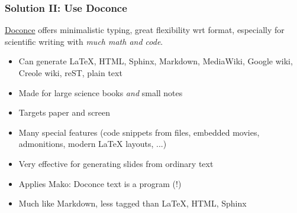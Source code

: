 \documentclass{beamer}
\newcounter{doconce:exercise:counter}
\newcounter{doconce:movie:counter}
\begin{document}
\begin{frame}
\frametitle{Solution II: Use Doconce}

\href{{http://hplgit.github.io/doconce/doc/web/index.html}}{Doconce}
offers minimalistic typing, great flexibility wrt format,
especially for scientific writing with \emph{much math and code}.

\begin{itemize}
 \item Can generate {\LaTeX}, HTML, Sphinx, Markdown, MediaWiki, Google wiki,
   Creole wiki, reST, plain text

 \item Made for large science books \emph{and} small notes

 \item Targets paper and screen

 \item Many special features (code snippets from files, embedded movies,
   admonitions, modern {\LaTeX} layouts, ...)

 \item Very effective for generating slides from ordinary text

 \item Applies Mako: Doconce text is a program (!)

 \item Much like Markdown, less tagged than {\LaTeX}, HTML, Sphinx
\end{itemize}

\noindent
\end{frame}
\end{document}
